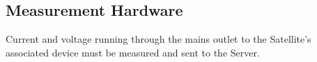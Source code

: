
\subsection{Measurement Hardware}
Current and voltage running through the mains outlet to the Satellite's associated device must be measured and sent to the Server. 
